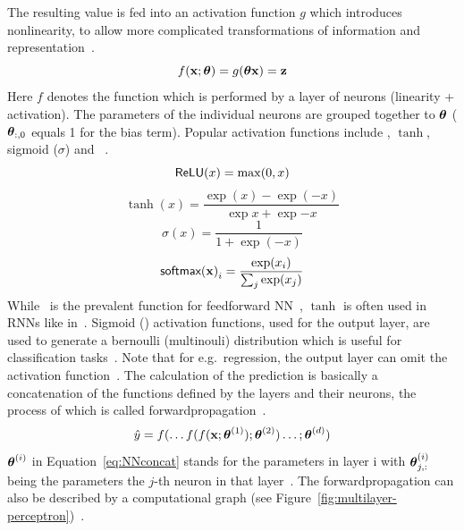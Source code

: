 The resulting value is fed into an activation function $g$ which introduces nonlinearity, to allow
more complicated transformations of information and representation~\citep{goodfellow_deep_2016}.
\begin{equation}\label{eq:neuron}
    f(\textbf{x};\boldsymbol{\theta}) = g(\boldsymbol{\theta}\textbf{x})=\textbf{z}
\end{equation}
Here $f$ denotes the function which is performed by a layer of neurons (linearity + activation).
The parameters of the individual neurons are grouped together to $\boldsymbol{\theta}$ ($\boldsymbol{\theta}_{:,0}$ equals 1 for the
bias term).
Popular activation functions include \relu, $\tanh$, sigmoid ($\sigma$) and
\sfmx~\citep{shrestha_review_2019}.
\begin{equation}\label{eq:relu}
    \textsf{ReLU}(x)=\max(0,x)
\end{equation}
\begin{equation}\label{eq:tanh}
    \tanh(x)=\frac{\exp(x)-\exp(-x)}{\exp{x}+\exp{-x}}
\end{equation}
\begin{equation}\label{eq:sigmoid}
    \sigma(x)=\frac{1}{1+\exp(-x)}
\end{equation}
\begin{equation}\label{eq:softmax}
    {\textsf{softmax}(\textbf{x})}_i = \frac{\exp(x_i)}{\sum_j \exp(x_j)}
\end{equation}
While \relu\ is the prevalent function for feedforward \ac{NN}~\citep{goodfellow_deep_2016},
$\tanh$ is often used in \acp{RNN} like in~\cite{sherstinsky_fundamentals_2020,greff_lstm_2017}.
Sigmoid (\sfmx) activation functions, used for the output layer, are used to generate a bernoulli
(multinouli) distribution which is useful for classification tasks~\citep{goodfellow_deep_2016}.
Note that for e.g.\ regression, the output layer can omit the activation
function~\citep{goodfellow_deep_2016}.
The calculation of the prediction is basically a concatenation of the functions defined by the
layers and their neurons, the process of which is called
forwardpropagation~\citep{ponti_everything_2017,goodfellow_deep_2016}.
\begin{equation}\label{eq:NNconcat}
    \hat{y}=f(\ldots f(f(\textbf{x};\boldsymbol{\theta}^{(1)});\boldsymbol{\theta}^{(2)})\ldots;\boldsymbol{\theta}^{(d)})
\end{equation}
$\boldsymbol{\theta}^{(i)}$ in Equation~\ref{eq:NNconcat} stands for the parameters in layer i with $\boldsymbol{\theta}^{(i)}_{j,:}$
being the parameters the $j$-th neuron in that layer~\citep{goodfellow_deep_2016}.
The forwardpropagation can also be described by a computational graph (see
Figure~\ref{fig:multilayer-perceptron})~\citep{goodfellow_deep_2016}.

